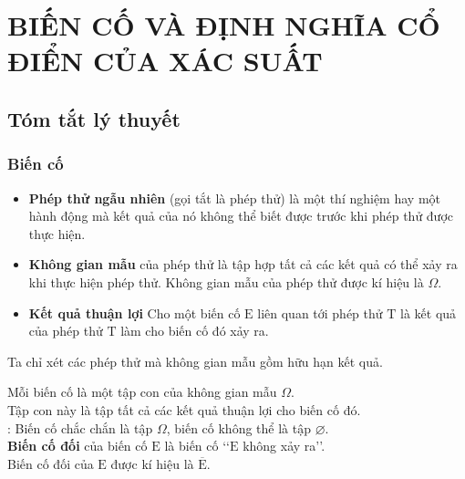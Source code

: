 \setcounter{section}{4}
\setcounter{dang}{0}
\section{BIẾN CỐ VÀ ĐỊNH NGHĨA CỔ ĐIỂN CỦA XÁC SUẤT}
\subsection{Tóm tắt lý thuyết}
\subsubsection{Biến cố}
\begin{itemize}
	\item {\bf{Phép thử ngẫu nhiên}} (gọi tắt là phép thử) là một thí nghiệm hay một hành động mà kết quả của nó không thể biết được trước khi phép thử được thực hiện.
	\item {\bf{Không gian mẫu}} của phép thử là tập hợp tất cả  các kết quả có thể xảy ra khi thực hiện phép thử. Không gian mẫu của phép thử được kí hiệu là $ \Omega $.
	\item {\bf{Kết quả thuận lợi}} Cho một biến cố $ \mathrm{E} $ liên quan tới phép thử $ \mathrm{T} $ là kết quả của phép thử $ \mathrm{T} $ làm cho biến cố  đó xảy ra.
\end{itemize}
\begin{note}
	Ta chỉ xét các phép thử mà không gian mẫu gồm hữu hạn kết quả.
\end{note} 
Mỗi biến cố là một tập con của không gian mẫu $ \Omega $. \\
Tập con này  là tập tất cả các kết quả thuận lợi cho biến cố đó.\\
: Biến cố chắc chắn là tập $ \Omega $, biến cố không thể là tập $ \varnothing $.	\\
{\bf{Biến cố đối}} của biến cố $ \mathrm{E} $ là biến cố \lq\lq $ \mathrm{E}$ không xảy ra\rq\rq.\\
Biến cố đối của $ \mathrm{E} $ được kí hiệu là $ \mathrm{\overline{E}} $.
